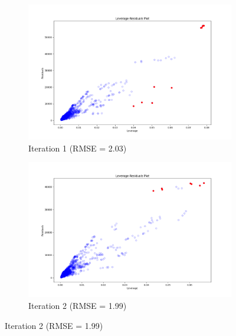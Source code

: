 \begin{figure}[]
\centering

\begin{subfigure}{.5\textwidth}
    \centering
    \includegraphics[width=0.9\linewidth]{images/FeOT_Full_1.png}
    \caption{Iteration 1 (RMSE = 2.03)}
    \label{fig:iteration1}
\end{subfigure}%
\begin{subfigure}{.5\textwidth}
    \centering
    \includegraphics[width=0.9\linewidth]{images/FeOT_Full_2.png}
    \caption{Iteration 2 (RMSE = 1.99)}
    \label{fig:iteration2}
\end{subfigure}


\end{figure}
